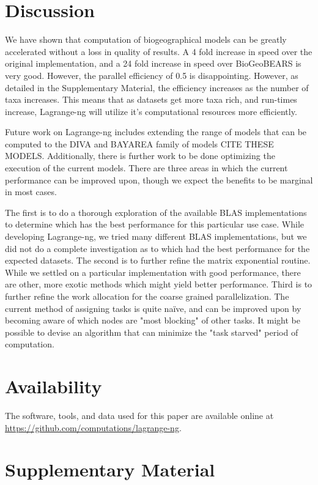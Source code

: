 \documentclass[oupdraft]{sysbio}
\begin{document}
\section{Discussion}\label{sec:Discussion}

We have shown that computation of biogeographical models can be greatly accelerated without a loss in quality of
results. A 4 fold increase in speed over the original implementation, and a 24 fold increase in speed over BioGeoBEARS
is very good. However, the parallel efficiency of 0.5 is disappointing. However, as detailed in the Supplementary
Material, the efficiency increases as the number of taxa increases. This means that as datasets get more taxa rich, and
run-times increase, Lagrange-ng will utilize it's computational resources more efficiently.

Future work on Lagrange-ng includes extending the range of models that can be computed to the DIVA and BAYAREA family of
models CITE THESE MODELS. Additionally, there is further work to be done optimizing the execution of the current models.
There are three areas in which the current performance can be improved upon, though we expect the benefits to be
marginal in most cases.

The first is to do a thorough exploration of the available BLAS implementations to determine which has the best
performance for this particular use case. While developing Lagrange-ng, we tried many different BLAS implementations,
but we did not do a complete investigation as to which had the best performance for the expected datasets. The second is
to further refine the matrix exponential routine. While we settled on a particular implementation with good performance,
there are other, more exotic methods which might yield better performance. Third is to further refine the work
allocation for the coarse grained parallelization. The current method of assigning tasks is quite na\"ive, and can be
improved upon by becoming aware of which nodes are "most blocking" of other tasks. It might be possible to devise an
algorithm that can minimize the "task starved" period of computation.

\bigskip

\section{Availability}\label{sec:availability}

The software, tools, and data used for this paper are available online at
\url{https://github.com/computations/lagrange-ng}.

\section{Supplementary Material}

\bigskip\bigskip



\end{document}
